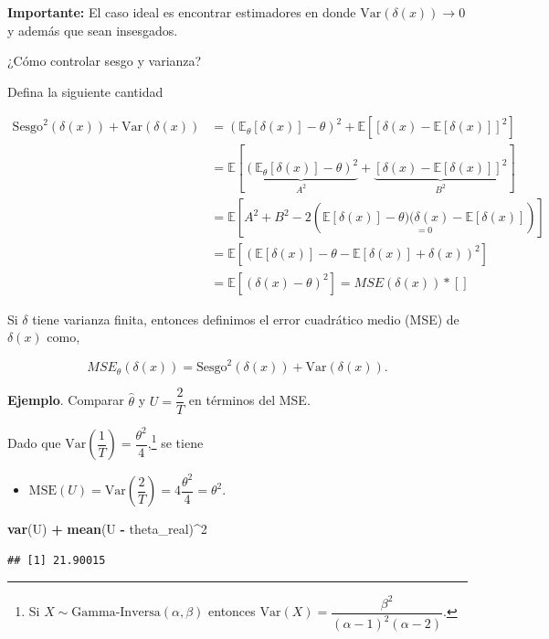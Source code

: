 \documentclass[
  12pt,
]{book}
\newenvironment{Shaded}{\begin{snugshade}}{\end{snugshade}}
\newcommand{\DecValTok}[1]{\textcolor[rgb]{0.00,0.00,0.81}{#1}}
\newcommand{\KeywordTok}[1]{\textcolor[rgb]{0.13,0.29,0.53}{\textbf{#1}}}
\newcommand{\NormalTok}[1]{#1}
\newcommand{\OperatorTok}[1]{\textcolor[rgb]{0.81,0.36,0.00}{\textbf{#1}}}
\newcommand{\StringTok}[1]{\textcolor[rgb]{0.31,0.60,0.02}{#1}}
\providecommand{\tightlist}{%
  \setlength{\itemsep}{0pt}\setlength{\parskip}{0pt}}
\begin{document}
\textbf{Importante:} El caso ideal es encontrar estimadores en donde
\(\text{Var}(\delta(x))\to 0\) y además que sean insesgados.

¿Cómo controlar sesgo y varianza?

Defina la siguiente cantidad

\begin{align*}
\text{Sesgo}^2(\delta(x))+\text{Var}(\delta(x)) & = (\mathbb E_\theta[\delta(x)]-\theta)^2 + \mathbb E[[\delta(x)-\mathbb E[\delta(x)]]^2]\\
    & =\mathbb E[ \underbrace{(\mathbb E_\theta[\delta(x)]-\theta)^2}_{A^2} + \underbrace{[\delta(x)-\mathbb E[\delta(x)]]^2}_{B^2}]\\
    & = \mathbb E[A^2+B^2 - 2(\underset{=0}{\mathbb E[\delta(x)]-\theta)(\delta(x)-\mathbb E[\delta(x)]})]\\
    & =  \mathbb E[(\mathbb E[\delta(x)]-\theta - \mathbb E[\delta(x)] + \delta(x))^2]\\
    & = \mathbb E[(\delta(x)-\theta)^2] = MSE(\delta(x))
  * [ ] \end{align*}

Si \(\delta\) tiene varianza finita, entonces definimos el error cuadrático medio
(MSE) de \(\delta(x)\) como,

\[MSE_{\theta}(\delta(x)) =\text{Sesgo}^2(\delta(x)) + \text{Var}(\delta(x)).\]

\textbf{Ejemplo}. Comparar \(\hat\theta\) y \(U =\dfrac 2T\) en términos del MSE.

Dado que \(\text{Var}\left(\dfrac 1T\right) = \dfrac{\theta^2}4\),\footnote{Si \(X\sim\text{Gamma-Inversa}(\alpha, \beta)\) entonces \(\text{Var}(X)=\dfrac{\beta ^{2}}{(\alpha -1)^2(\alpha-2)}\).} se tiene

\begin{itemize}
\tightlist
\item
  \(\mathrm{MSE}(U) = \text{Var}\left(\dfrac 2T\right) = 4\dfrac{\theta^2}4 = \theta^2\).
\end{itemize}

\begin{Shaded}
\begin{Highlighting}[]
\KeywordTok{var}\NormalTok{(U) }\OperatorTok{+}\StringTok{ }\KeywordTok{mean}\NormalTok{(U }\OperatorTok{{-}}\StringTok{ }\NormalTok{theta\_real)}\OperatorTok{\^{}}\DecValTok{2}
\end{Highlighting}
\end{Shaded}

\begin{verbatim}
## [1] 21.90015
\end{verbatim}
\end{document}
